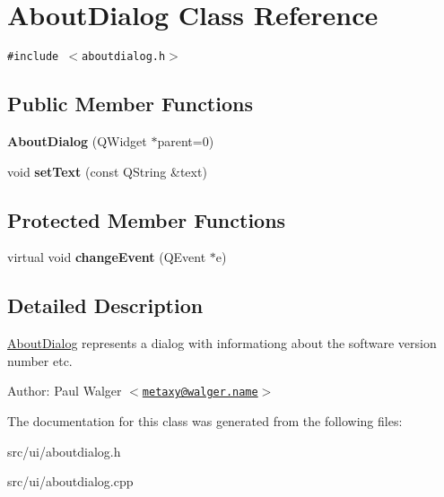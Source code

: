\hypertarget{classAboutDialog}{
\section{AboutDialog Class Reference}
\label{classAboutDialog}
}
{\tt \#include $<$aboutdialog.h$>$}

\subsection*{Public Member Functions}
\begin{CompactItemize}
\item 
\hypertarget{classAboutDialog_d96fc2ce8de7568ace543b7c69c71c56}{
\textbf{AboutDialog} (QWidget $\ast$parent=0)}
\label{classAboutDialog_d96fc2ce8de7568ace543b7c69c71c56}

\item 
\hypertarget{classAboutDialog_42c59fd60ea452b58e1126416e63c920}{
void \textbf{setText} (const QString \&text)}
\label{classAboutDialog_42c59fd60ea452b58e1126416e63c920}

\end{CompactItemize}
\subsection*{Protected Member Functions}
\begin{CompactItemize}
\item 
\hypertarget{classAboutDialog_bac18da2759d1b4bb0e5bca856b0efcf}{
virtual void \textbf{changeEvent} (QEvent $\ast$e)}
\label{classAboutDialog_bac18da2759d1b4bb0e5bca856b0efcf}

\end{CompactItemize}


\subsection{Detailed Description}
\hyperlink{classAboutDialog}{AboutDialog} represents a dialog with informationg about the software version number etc.

\begin{Desc}
\item[Author:]Paul Walger $<$\href{mailto:metaxy@walger.name}{\tt metaxy@walger.name}$>$ \end{Desc}


The documentation for this class was generated from the following files:\begin{CompactItemize}
\item 
src/ui/aboutdialog.h\item 
src/ui/aboutdialog.cpp\end{CompactItemize}
